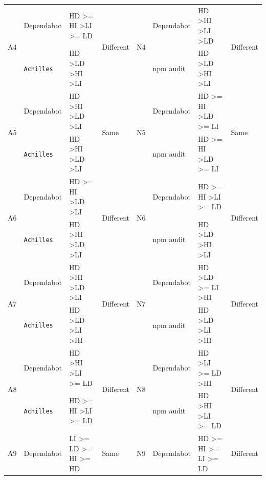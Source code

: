 \documentclass[conference]{IEEEtran}
\begin{document}
\begin{table}[tb]
\begin{tabular}{clll|clll}
			\midrule
			\multirow{2}{*}{A4}  & Dependabot & HD \textgreater{}= HI \textgreater LI \textgreater{}= LD    & \multirow{2}{*}{Different}      & \multirow{2}{*}{N4} & Dependabot & HD \textgreater HI \textgreater LI \textgreater LD & \multirow{2}{*}{Different} \\ 
			& \texttt{Achilles}   & HD \textgreater LD \textgreater HI \textgreater LI & & & npm audit &  HD \textgreater LD \textgreater HI \textgreater LI & \\ 
			\midrule
			\multirow{2}{*}{A5}  & Dependabot & HD \textgreater HI \textgreater LD \textgreater LI          & \multirow{2}{*}{Same}           & \multirow{2}{*}{N5} & Dependabot & HD \textgreater{}= HI \textgreater LD \textgreater{}= LI & \multirow{2}{*}{Same} \\ 
			& \texttt{Achilles}   & HD \textgreater HI \textgreater LD \textgreater LI & & & npm audit & HD \textgreater{}= HI \textgreater LD \textgreater{}= LI  & \\ 
			\midrule
			\multirow{2}{*}{A6}  & Dependabot & HD \textgreater{}= HI \textgreater LD \textgreater LI       & \multirow{2}{*}{Different}      & \multirow{2}{*}{N6} & Dependabot & HD \textgreater{}= HI \textgreater LI \textgreater{}= LD & \multirow{2}{*}{Different} \\ 
			& \texttt{Achilles}   & HD \textgreater HI \textgreater LD \textgreater LI & & & npm audit & HD \textgreater LD \textgreater HI \textgreater LI & \\ 
			\midrule
			\multirow{2}{*}{A7}  & Dependabot & HD \textgreater HI \textgreater LD \textgreater LI & \multirow{2}{*}{Different}      & \multirow{2}{*}{N7} & Dependabot & HD \textgreater LD \textgreater{}= LI \textgreater HI & \multirow{2}{*}{Different} \\  
			& \texttt{Achilles}   & HD \textgreater LD \textgreater LI \textgreater HI & & & npm audit & HD \textgreater LD \textgreater LI \textgreater HI &  \\ 
			\midrule
			\multirow{2}{*}{A8}  & Dependabot & HD \textgreater HI \textgreater LI \textgreater{}= LD       & \multirow{2}{*}{Different}      & \multirow{2}{*}{N8} & Dependabot & HD \textgreater LI \textgreater{}= LD \textgreater HI & \multirow{2}{*}{Different} \\ 
			& \texttt{Achilles}   & HD \textgreater{}= HI \textgreater LI \textgreater{}= LD    &                                 & & npm audit & HD \textgreater HI \textgreater LI \textgreater{}= LD & \\ 
			\midrule
			\multirow{2}{*}{A9}  & Dependabot & LI \textgreater{}= LD \textgreater{}= HI \textgreater{}= HD & \multirow{2}{*}{Same}           & \multirow{2}{*}{N9} & Dependabot & HD \textgreater{}= HI \textgreater{}= LI \textgreater{}= LD & \multirow{2}{*}{Different} \\ 

\end{tabular}
\end{table}
\end{document}
